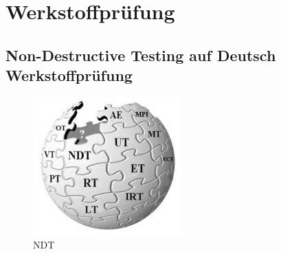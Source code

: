 \chapter{Werkstoffprüfung}
\label{sec:grundlagen}

\section{Non-Destructive Testing auf Deutsch Werkstoffprüfung}
\label{sec:ndt}
\begin{figure}[htb]
  \centering  
  \includegraphics[scale=0.9]{img/ndtazWiki.jpg}
  \caption{NDT}
  \label{fig:ndtazWiki}
\end{figure}


